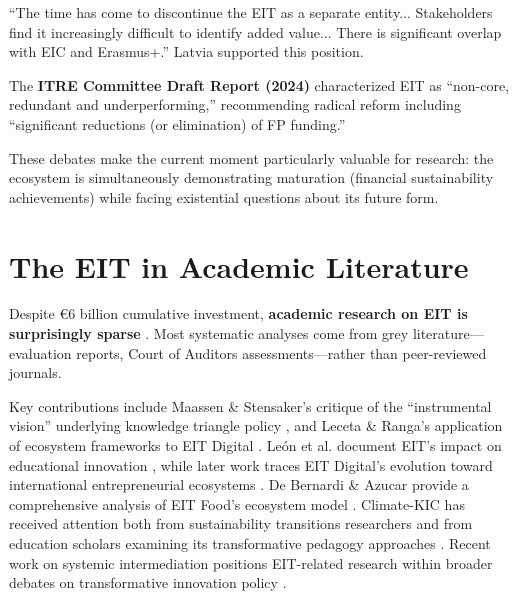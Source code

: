 \documentclass[../main.tex]{subfiles}
\begin{document}
\begin{criticalbox}
``The time has come to discontinue the EIT as a separate entity... Stakeholders find it increasingly difficult to identify added value... There is significant overlap with EIC and Erasmus+.'' Latvia supported this position.
\end{criticalbox}

The \textbf{ITRE Committee Draft Report (2024)} characterized EIT as ``non-core, redundant and underperforming,'' recommending radical reform including ``significant reductions (or elimination) of FP funding.''

These debates make the current moment particularly valuable for research: the ecosystem is simultaneously demonstrating maturation (financial sustainability achievements) while facing existential questions about its future form.


\section*{The EIT in Academic Literature}

Despite €6 billion cumulative investment, \textbf{academic research on EIT is surprisingly sparse} \cite{pontikakis2022role,kivimaa2019innovation}. Most systematic analyses come from grey literature---evaluation reports, Court of Auditors assessments---rather than peer-reviewed journals.

Key contributions include Maassen \& Stensaker's critique of the ``instrumental vision'' underlying knowledge triangle policy \cite{maassen2011knowledge}, and Leceta \& Ranga's application of ecosystem frameworks to EIT Digital \cite{leceta2020eit}. León et al. document EIT's impact on educational innovation \cite{leon2018eit}, while later work traces EIT Digital's evolution toward international entrepreneurial ecosystems \cite{leceta2021eitdigital,balassone2024eitdigital}. De Bernardi \& Azucar provide a comprehensive analysis of EIT Food's ecosystem model \cite{debernardi2020eitfood}. Climate-KIC has received attention both from sustainability transitions researchers and from education scholars examining its transformative pedagogy approaches \cite{klapper2024pedagogy}. Recent work on systemic intermediation positions EIT-related research within broader debates on transformative innovation policy \cite{brodnik2024intermediation}.
\end{document}
